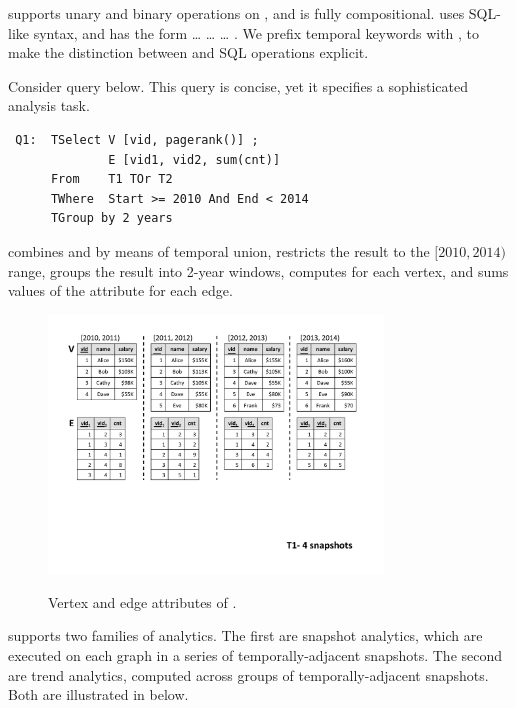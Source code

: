 \ql supports unary and binary operations on \tgs, and is fully
compositional. \ql uses SQL-like syntax, and has the form
 \ldots {} \ldots {} \ldots
{}.  We prefix temporal keywords with , to make
the distinction between \ql and SQL operations explicit. 


Consider query  below.  This query is concise, yet it
specifies a sophisticated analysis task.\\

{\footnotesize
\begin{verbatim}
 Q1:  TSelect V [vid, pagerank()] ; 
              E [vid1, vid2, sum(cnt)] 
      From    T1 TOr T2 
      TWhere  Start >= 2010 And End < 2014 
      TGroup by 2 years
\end{verbatim}
}

 combines \tgs {} and  by means of
temporal union, restricts the result to the $[2010, 2014)$ range,
  groups the result into 2-year windows, computes 
  for each vertex, and sums values of the attribute  for
  each edge.

\begin{figure}[t!]
  \centering
\includegraphics[width=3.5in]{figs/4snaps_T1_ve.pdf}
  \caption{Vertex and edge attributes of \tg {}.}{}
  \label{fig:tg_t1_ve}
\end{figure}


\ql supports two families of analytics.  The first are snapshot
analytics, which are executed on each graph in a series of
temporally-adjacent snapshots.  The second are trend analytics,
computed across groups of temporally-adjacent snapshots.  Both are
illustrated in  below.

